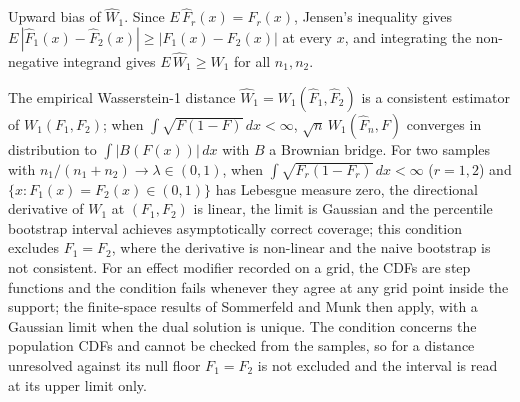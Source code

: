 \documentclass[AMA,Times1COL]{WileyNJDv5}
\begin{document}

Upward bias of $\widehat{W}_1$. Since $E\,\hat{F}_r(x) = F_r(x)$, Jensen's inequality gives $E\,|\hat{F}_1(x) - \hat{F}_2(x)| \geq |F_1(x) - F_2(x)|$ at every $x$, and integrating the non-negative integrand gives $E\,\widehat{W}_1 \geq W_1$ for all $n_1, n_2$.

The empirical Wasserstein-1 distance $\widehat{W}_1 = W_1(\hat{F}_1, \hat{F}_2)$ is a consistent estimator of $W_1(F_1, F_2)$; when $\int \sqrt{F(1-F)}\,dx < \infty$, $\sqrt{n}\,W_1(\hat{F}_n, F)$ converges in distribution to $\int |B(F(x))|\,dx$ with $B$ a Brownian bridge.\cite{delbarrio1999} For two samples with $n_1/(n_1+n_2) \to \lambda \in (0,1)$, when $\int \sqrt{F_r(1-F_r)}\,dx < \infty$ ($r = 1, 2$) and $\{x : F_1(x) = F_2(x) \in (0,1)\}$ has Lebesgue measure zero, the directional derivative of $W_1$ at $(F_1, F_2)$ is linear, the limit is Gaussian and the percentile bootstrap interval achieves asymptotically correct coverage;\cite{fang2019} this condition excludes $F_1 = F_2$, where the derivative is non-linear and the naive bootstrap is not consistent.\cite{dumbgen1993,fang2019} For an effect modifier recorded on a grid, the CDFs are step functions and the condition fails whenever they agree at any grid point inside the support; the finite-space results of Sommerfeld and Munk then apply,\cite{sommerfeld2018} with a Gaussian limit when the dual solution is unique. The condition concerns the population CDFs and cannot be checked from the samples, so for a distance unresolved against its null floor $F_1 = F_2$ is not excluded and the interval is read at its upper limit only.

\end{document}
